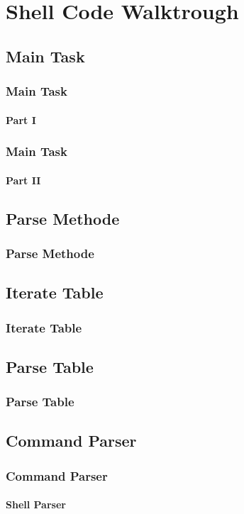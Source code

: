 \section{Shell Code Walktrough}
\subsection{Main Task}
\begin{frame}[fragile]
    \frametitle{Main Task}
    \framesubtitle{Part I}
       \lstset{language=C}
       
\end{frame}

\begin{frame}[fragile]
    \frametitle{Main Task}
    \framesubtitle{Part II}
       \lstset{language=C}
       
\end{frame}

\subsection{Parse Methode}
\begin{frame}[fragile]
    \frametitle{Parse Methode}
       \lstset{language=C}
       
\end{frame}

\subsection{Iterate Table}
\begin{frame}[fragile]
    \frametitle{Iterate Table}
       \lstset{language=C}
       
\end{frame}

\subsection{Parse Table}
\begin{frame}[fragile]
    \frametitle{Parse Table}
       \lstset{language=C}
       
\end{frame}

\subsection{Command Parser}
\begin{frame}[fragile]
    \frametitle{Command Parser}
    \framesubtitle{Shell Parser}
       \lstset{language=C}
       
\end{frame}